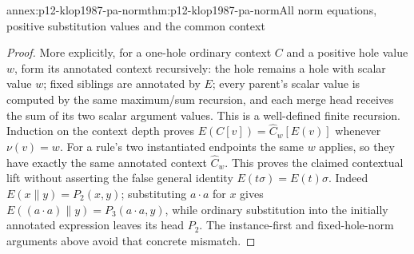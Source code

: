 \begin{annexitem}{annex:p12-klop1987-pa-norm}{thm:p12-klop1987-pa-norm}{All norm equations, positive substitution values and the common context}
\begin{proof}
More explicitly, for a one-hole ordinary context \(C\) and a
positive hole value \(w\), form its annotated context recursively:
the hole remains a hole with scalar value \(w\); fixed siblings
are annotated by \(E\); every parent's scalar value is computed
by the same maximum/sum recursion, and each merge head receives
the sum of its two scalar argument values. This is a well-defined
finite recursion. Induction on the context depth proves
\(E(C[v])=\widehat C_w[E(v)]\) whenever \(\nu(v)=w\).
For a rule's two instantiated endpoints the same \(w\) applies,
so they have exactly the same annotated context \(\widehat C_w\).
This proves the claimed contextual lift without asserting the
false general identity \(E(t\sigma)=E(t)\sigma\).
Indeed \(E(x\parallel y)=P_2(x,y)\); substituting
\(a\cdot a\) for \(x\) gives
\(E((a\cdot a)\parallel y)=P_3(a\cdot a,y)\), while
ordinary substitution into the initially annotated expression leaves
its head \(P_2\). The instance-first and fixed-hole-norm arguments
above avoid that concrete mismatch.
\end{proof}
\end{annexitem}

